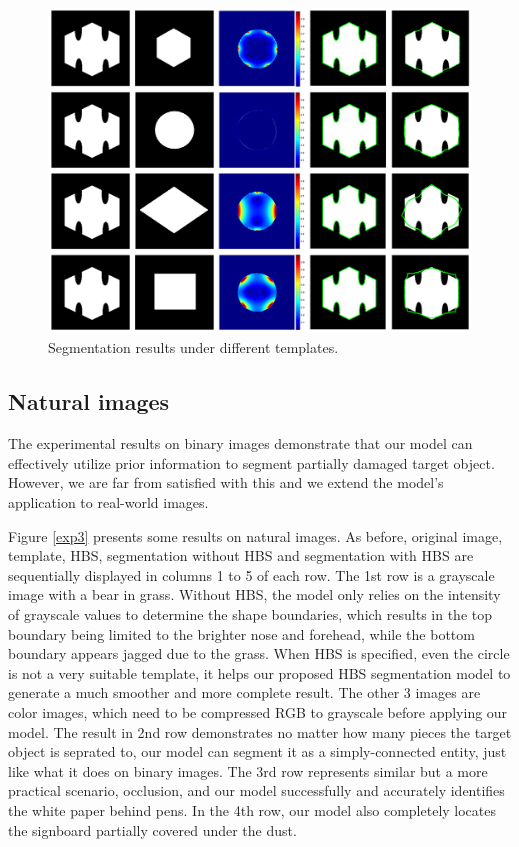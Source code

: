 \documentclass[review,onefignum,onetabnum]{siamonline190516}
\begin{document}
\begin{figure}
    \begin{center}
        \includegraphics[width=15.5cm]{src/exp2.png}
    \end{center}
    \caption{Segmentation results under different templates.}
    \label{exp2}
\end{figure}

\subsection{Natural images}
The experimental results on binary images demonstrate that our model can effectively utilize prior information to segment partially damaged target object. However, we are far from satisfied with this and we extend the model's application to real-world images.

Figure \ref{exp3} presents some results on natural images. As before, original image, template, HBS, segmentation without HBS and segmentation with HBS are sequentially displayed in columns 1 to 5 of each row. The 1st row is a grayscale image with a bear in grass. Without HBS, the model only relies on the intensity of grayscale values to determine the shape boundaries, which results in the top boundary being limited to the brighter nose and forehead, while the bottom boundary appears jagged due to the grass. When HBS is specified, even the circle is not a very suitable template, it helps our proposed HBS segmentation model to generate a much smoother and more complete result. The other 3 images are color images, which need to be compressed RGB to grayscale before applying our model. The result in 2nd row demonstrates no matter how many pieces the target object is seprated to, our model can segment it as a simply-connected entity, just like what it does on binary images. The 3rd row represents similar but a more practical scenario, occlusion, and our model successfully and accurately identifies the white paper behind pens. In the 4th row, our model also completely locates the signboard partially covered under the dust. 
\end{document}
